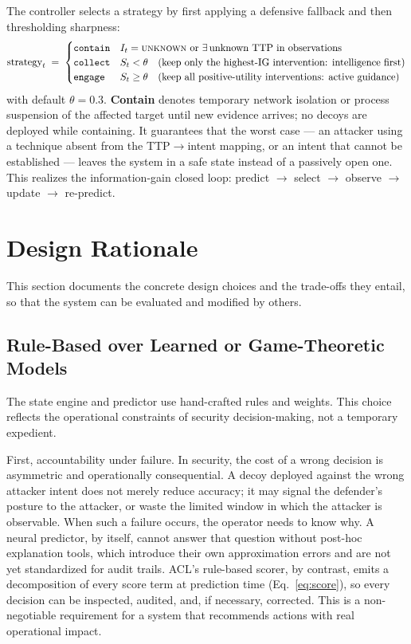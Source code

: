 \documentclass[11pt]{article}
\newcommand{\act}[1]{\texttt{#1}}
\newcommand{\intent}[1]{\textsc{#1}}
\begin{document}
The controller selects a strategy by first applying a defensive fallback
and then thresholding sharpness:
\begin{equation}
\label{eq:strategy}
\text{strategy}_t \;=\;
\begin{cases}
\act{contain} & I_t = \intent{unknown} \text{ or } \exists\, \text{unknown
TTP in observations} \\
\act{collect} & S_t < \theta \quad\text{(keep only the highest-IG
intervention: intelligence first)} \\
\act{engage} & S_t \geq \theta \quad\text{(keep all positive-utility
interventions: active guidance)}
\end{cases}
\end{equation}
with default $\theta = 0.3$. \textbf{Contain} denotes temporary network
isolation or process suspension of the affected target until new evidence
arrives; no decoys are deployed while containing. It guarantees that the
worst case --- an attacker using a technique absent from the TTP$\to$intent
mapping, or an intent that cannot be established --- leaves the system in a
safe state instead of a passively open one. This realizes the
information-gain closed loop: predict $\to$ select $\to$ observe $\to$
update $\to$ re-predict.

\section{Design Rationale}
\label{sec:rationale}

This section documents the concrete design choices and the trade-offs they
entail, so that the system can be evaluated and modified by others.

\subsection{Rule-Based over Learned or Game-Theoretic Models}
The state engine and predictor use hand-crafted rules and weights. This choice reflects the operational constraints of security decision-making, not a temporary expedient.

First, accountability under failure. In security, the cost of a wrong decision is asymmetric and operationally consequential. A decoy deployed against the wrong attacker intent does not merely reduce accuracy; it may signal the defender's posture to the attacker, or waste the limited window in which the attacker is observable. When such a failure occurs, the operator needs to know why. A neural predictor, by itself, cannot answer that question without post-hoc explanation tools, which introduce their own approximation errors and are not yet standardized for audit trails. ACL's rule-based scorer, by contrast, emits a decomposition of every score term at prediction time (Eq.~\ref{eq:score}), so every decision can be inspected, audited, and, if necessary, corrected. This is a non-negotiable requirement for a system that recommends actions with real operational impact.
\end{document}
